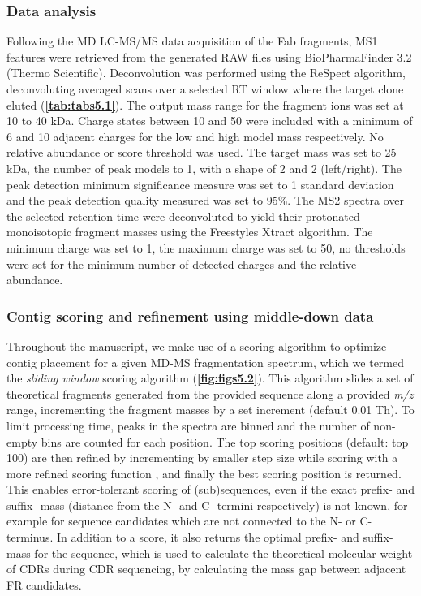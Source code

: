 \subsubsection{Data analysis}
Following the MD LC-MS/MS data acquisition of the Fab fragments, MS1 features were retrieved from the generated RAW files using BioPharmaFinder 3.2 (Thermo Scientific). Deconvolution was performed using the ReSpect algorithm, deconvoluting averaged scans over a selected RT window where the target clone eluted (\textbf{\autoref{tab:tabs5.1}}). The output mass range for the fragment ions was set at 10 to 40 kDa. Charge states between 10 and 50 were included with a minimum of 6 and 10 adjacent charges for the low and high model mass respectively. No relative abundance or score threshold was used. The target mass was set to 25 kDa, the number of peak models to 1, with a shape of 2 and 2 (left/right). The peak detection minimum significance measure was set to 1 standard deviation and the peak detection quality measured was set to 95\%. The MS2 spectra over the selected retention time were deconvoluted to yield their protonated monoisotopic fragment masses using the Freestyles Xtract algorithm. The minimum charge was set to 1, the maximum charge was set to 50, no thresholds were set for the minimum number of detected charges and the relative abundance.

\subsubsection{Contig scoring and refinement using middle-down data}
Throughout the manuscript, we make use of a scoring algorithm to optimize contig placement for a given MD-MS fragmentation spectrum, which we termed the \emph{sliding window} scoring algorithm (\textbf{\autoref{fig:figs5.2}}). This algorithm slides a set of theoretical fragments generated from the provided sequence along a provided \emph{m/z} range, incrementing the fragment masses by a set increment (default 0.01 Th). To limit processing time, peaks in the spectra are binned and the number of non-empty bins are counted for each position. The top scoring positions (default: top 100) are then refined by incrementing by smaller step size while scoring with a more refined scoring function \cite{olsen2004improved}, and finally the best scoring position is returned. This enables error-tolerant scoring of (sub)sequences, even if the exact prefix- and suffix- mass (distance from the N- and C- termini respectively) is not known, for example for sequence candidates which are not connected to the N- or C- terminus. In addition to a score, it also returns the optimal prefix- and suffix- mass for the sequence, which is used to calculate the theoretical molecular weight of CDRs during CDR sequencing, by calculating the mass gap between adjacent FR candidates.


